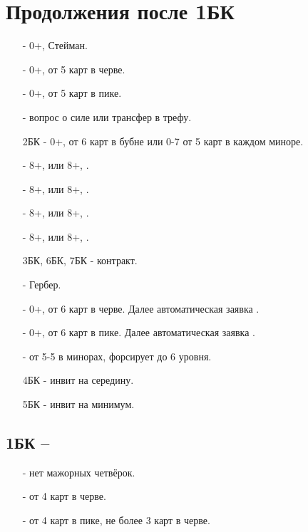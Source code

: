 \documentclass{article}
\begin{document}
\section{Продолжения после 1БК}
\begin{enumerate}
    \item[\cl{2}] - 0+, Стейман.
    \item[\di{2}] - 0+, от 5 карт в черве.
    \item[\he{2}] - 0+, от 5 карт в пике.
    \item[\sp{2}] - вопрос о силе или трансфер в трефу.
    \item[2БК] - 0+, от 6 карт в бубне или 0-7 от 5 карт в каждом миноре.
    \item[\cl{3}] - 8+,  или 8+, .
    \item[\di{3}] - 8+,  или 8+, .
    \item[\he{3}] - 8+,  или 8+, .
    \item[\sp{3}] - 8+,  или 8+, .
    \item[3БК, 6БК, 7БК] - контракт.
    \item[\cl{4}] - Гербер.
    \item[\di{4}] - 0+, от 6 карт в черве. Далее автоматическая заявка .
    \item[\he{4}] - 0+, от 6 карт в пике. Далее автоматическая заявка .
    \item[\sp{4}] - от 5-5 в минорах, форсирует до 6 уровня.
    \item[4БК] - инвит на середину.
    \item[5БК] - инвит на минимум.
\end{enumerate}
\subsection{1БК -- }
\begin{enumerate}
    \item[\di{2}] - нет мажорных четвёрок.
    \item[\he{2}] - от 4 карт в черве.
    \item[\sp{2}] - от 4 карт в пике, не более 3 карт в черве.
\end{enumerate}
\end{document}
